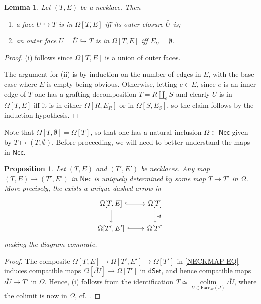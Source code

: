 \documentclass[a4paper,10pt
,draft
]{article}%
\numberwithin{equation}{section}
\numberwithin{figure}{section}
\newtheorem{lemma}[equation]{Lemma}%
\newtheorem{proposition}[equation]{Proposition}%
\theoremstyle{definition} %
\DeclareMathOperator{\colim}{colim}%
\newcommand{\1}{\ensuremath{\mathbbm 1}}%
\begin{document}
\begin{lemma}\label{FACEINNECK LEM}
	Let $(T,E)$ be a necklace. Then
\begin{enumerate}[label=(\roman*)]
	\item a face $U \hookrightarrow T$
	is in $\Omega[T,E]$
	iff its outer closure $\bar{U}$ is; 
	\item an outer face 
	$U = \bar{U} \hookrightarrow T$
	is in $\Omega[T,E]$ iff $E_U = \emptyset$.
\end{enumerate}
\end{lemma}

\begin{proof}
	(i) follows since $\Omega[T,E]$
	is a union of outer faces.
	
	The argument for (ii) is by induction on the number of edges in $E$,
	with the base case where $E$ is empty being obvious.
%	
	Otherwise, letting $e\in E$, since $e$ is an inner edge of $T$
	one has a grafting decomposition
	$T = R \amalg_e S$
	and clearly 
	$U$ is in $\Omega[T,E]$
	iff it is in either
	$\Omega[R,E_R]$ or in $\Omega[S,E_S]$,
	so the claim follows by the induction hypothesis.
\end{proof}




Note that 
$\Omega[T,\emptyset] = \Omega[T]$,
so that one has a natural inclusion
$\Omega \subset \mathsf{Nec}$
given by $T \mapsto (T,\emptyset)$.
Before proceeding, we will need to better understand the maps in 
$\mathsf{Nec}$.




\begin{proposition}
Let $(T,E)$ and $(T',E')$ be necklaces. 
Any map $(T,E) \to (T',E')$ in $\mathsf{Nec}$
is uniquely determined by some map 
$T \to T'$ in $\Omega$. 
More precisely, the exists a unique dashed arrow in 
\begin{equation}\label{NECKMAP EQ}
\begin{tikzcd}
	\Omega[T,E] 
	\ar[hookrightarrow]{r} 
	\ar{d}
&
	\Omega[T] 
	\ar[dashed]{d}{\exists !}
\\
	\Omega[T',E']
	\ar[hookrightarrow]{r}
&
	\Omega[T']
\end{tikzcd}
\end{equation}
making the diagram commute.
\end{proposition}

\begin{proof}
	The composite
	$\Omega[T,E] \to 
	\Omega[T',E'] \to 
	\Omega[T']$
	in \eqref{NECKMAP EQ}
	induces compatible maps
	$\Omega[\overline{\iota U}] \to \Omega[T']$
	in $\mathsf{dSet}$,
	and hence 
	compatible maps
	$\overline{\iota U} \to T'$
	in $\Omega$.
	Hence, (i) follows from the identification
	$T
	\simeq  
	\underset{U \in \mathsf{Face}_{sc}(J)}{\colim}
	\overline{\iota U}$, where the colimit is now in $\Omega$,
	cf. \cite[Cor. 3.70]{BP_geo}.
\end{proof}
\end{document}
